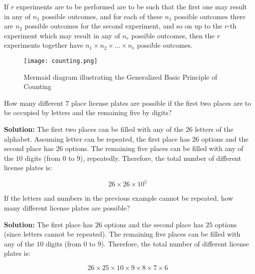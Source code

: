\begin{definitionbox}[title=The Generalized Basic Principle of Counting]
    If \(r\) experiments are to be performed are to be such that the first one may result in any of \(n_1\) possible outcomes, and for each of these \(n_{1}\) possible outcomes there are \(n_2\) possible outcomes for the second experiment, and so on up to the \(r\)-th experiment which may result in any of \(n_r\) possible outcomes, then the \(r\) experiments together have \(n_1 \times n_2 \times \ldots \times n_r\) possible outcomes.
\end{definitionbox}


\begin{figure}[H]
    \centering
    \texttt{[image: counting.png]}
    \caption{Mermaid diagram illustrating the Generalized Basic Principle of Counting}
    \label{fig:counting}
\end{figure}



\begin{examplebox}[title=Example: License Plates with Repetition]
    How many different \(7\) place license plates are possible if the first two places are to be occupied by letters and the remaining five by digits?
    
    \textbf{Solution:} The first two places can be filled with any of the \(26\) letters of the alphabet. Assuming letter can be repeated, the first place has \(26\) options and the second place has \(26\) options. The remaining five places can be filled with any of the \(10\) digits (from \(0\) to \(9\)), repeatedly. Therefore, the total number of different license plates is:

    \[
    26 \times 26 \times 10^5
    \]
\end{examplebox}

\begin{examplebox}[title=Example: License Plates without Repetition]
    If the letters and numbers in the previous example cannot be repeated, how many different license plates are possible?
    
    \textbf{Solution:} The first place has \(26\) options and the second place has \(25\) options (since letters cannot be repeated). The remaining five places can be filled with any of the \(10\) digits (from \(0\) to \(9\)). Therefore, the total number of different license plates is:

    \[
    26 \times 25 \times 10 \times 9 \times 8 \times 7 \times 6
    \]
\end{examplebox}

